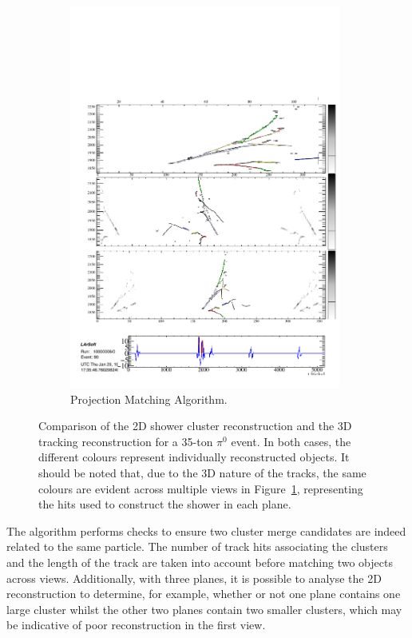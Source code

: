 \begin{figure}
\begin{subfigure}[t]{0.48\linewidth}
    \includegraphics[width=0.98\textwidth]{EVDPi0Tracks2D.pdf}
    \caption{Projection Matching Algorithm.}
    \label{fig:pi0ShowersTracksTracks}
  \end{subfigure}
  \caption[Comparison of the 2D shower cluster reconstruction and the 3D tracking reconstruction for a 35-ton $\pi^0$ event.]{Comparison of the 2D shower cluster reconstruction and the 3D tracking reconstruction for a 35-ton $\pi^0$ event.  In both cases, the different colours represent individually reconstructed objects.  It should be noted that, due to the 3D nature of the tracks, the same colours are evident across multiple views in Figure~\ref{fig:pi0ShowersTracksTracks}, representing the hits used to construct the shower in each plane.}
  \label{fig:pi0ShowersTracks}
\end{figure}

The algorithm performs checks to ensure two cluster merge candidates are indeed related to the same particle.  The number of track hits associating the clusters and the length of the track are taken into account before matching two objects across views.  Additionally, with three planes, it is possible to analyse the 2D reconstruction to determine, for example, whether or not one plane contains one large cluster whilst the other two planes contain two smaller clusters, which may be indicative of poor reconstruction in the first view.

